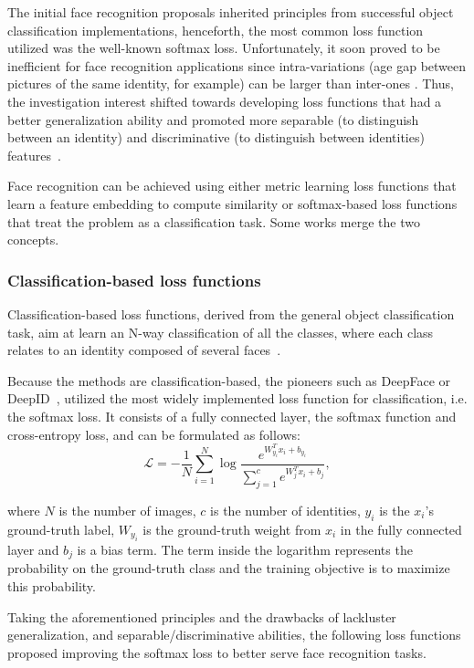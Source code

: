\documentclass[class=report, crop=false, a4paper, 12pt]{standalone}
\begin{document}
The initial face recognition proposals inherited principles from successful object classification implementations, henceforth, the most common loss function utilized was the well-known softmax loss. Unfortunately, it soon proved to be inefficient for face recognition applications since intra-variations (age gap between pictures of the same identity, for example) can be larger than inter-ones . Thus, the investigation interest shifted towards developing loss functions that had a better generalization ability and promoted more separable (to distinguish between an identity) and discriminative (to distinguish between identities) features~\autocite{wangDeepFaceRecognition2021}.
\par Face recognition can be achieved using either metric learning loss functions that learn a feature embedding to compute similarity or softmax-based loss functions that treat the problem as a classification task. Some works merge the two concepts.

\subsubsection{Classification-based loss functions}
Classification-based loss functions, derived from the general object classification task, aim at learn an N-way classification of all the classes, where each class relates to an identity composed of several faces~\autocite{duElementsEndtoendDeep2022}.
\par Because the methods are classification-based, the pioneers such as DeepFace or DeepID~\autocite{sunDeepLearningFace2014a}, utilized the most widely implemented loss function for classification, i.e. the softmax loss. It consists of a fully connected layer, the softmax function and cross-entropy loss, and can be formulated as follows:
\begin{equation}
\mathcal{L} = -\frac{1}{N}\sum_{i=1}^{N}\log{\frac{e^{W_{y_i}^{T}x_i+b_{y_i}}}{\sum_{j=1}^{c}e^{W_{j}^{T}x_i+b_{j}}}},
\end{equation}

\noindent where $N$ is the number of images, $c$ is the number of identities, $y_i$ is the $x_i$'s ground-truth label, $W_{y_i}$ is the ground-truth weight from $x_i$ in the fully connected layer and $b_j$ is a bias term. The term inside the logarithm represents the probability on the ground-truth class and the training objective is to maximize this probability.

\vspace{\baselineskip}
\par Taking the aforementioned principles and the drawbacks of lackluster generalization, and separable/discriminative abilities, the following loss functions proposed improving the softmax loss to better serve face recognition tasks.
\end{document}

